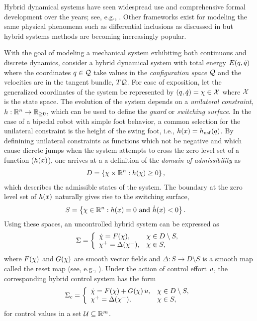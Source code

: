 Hybrid dynamical systems have seen widespread use and comprehensive formal development over the years; see, e.g., \cite{BrBoMi98,GoSaTe09,aut_2014_gcsa_01,ScSc00,WGCCM07}.
%
Other frameworks exist for modeling the same physical phenomena such as differential inclusions as discussed in \cite{Filippov88} but hybrid systems methods are becoming increasingly popular.

With the goal of modeling a mechanical system exhibiting both continuous and discrete dynamics, consider a hybrid dynamical system with total energy $E(q, \dot{q})$ where the coordinates $q \in \mathcal{Q}$ take values in the {\em configuration space} $\mathcal{Q}$ and the velocities are in the tangent bundle, $T\mathcal{Q}$.
%
For ease of exposition, let the generalized coordinates of the system be represented by $(q, \dot{q}) = \chi \in \mathcal{X}$ where $\mathcal{X}$ is the state space.
%
The evolution of the system depends on a {\em unilateral constraint}, $h : \mathbb{R}^{n} \to \mathbb{R}_{\geq 0}$, which can be used to define the {\em guard} or {\em switching surface}.
%
In the case of a bipedal robot with simple foot behavior, a common selection for the unilateral constraint is the height of the swing foot, i.e., $h(x) = h_{\mathrm{nsf}}(q)$.
%
By definining unilateral constraints as functions which not be negative and which cause dicrete jumps when the system attempts to cross the zero level set of a function ($h(x)$), one arrives at a a definition of the {\em domain of admissibility} as
%
\begin{align}
  \label{eq:domain}
  D &= \left\{ \chi \times \mathbb{R}^{n} : h(\chi) \geq 0 \right\},
\end{align}
%
which describes the admissible states of the system.
%
The boundary at the zero level set of $h(x)$ naturally gives rise to the switching surface,
%
\begin{align}
  \label{eq:guard}
  S &= \left\{ \chi \in \mathbb{R}^{n} : h(x) = 0 \mbox{ and } {\dot h}(x) < 0 \right\}.
\end{align}
%
Using these spaces, an uncontrolled hybrid system can be expressed as
%
\begin{align}
  \Sigma = \left\{
  \begin{array}{l l}
    {\dot {\chi}} = F(\chi), & \chi \in D \setminus S,\\
    \chi^{+} = \Delta(\chi^{-}), & \chi \in S,
  \end{array}\right.
  \label{eq:hsys}
\end{align}
%
where $F(\chi)$ and $G(\chi)$ are smooth vector fields and $\Delta : S \to D \setminus S$ is a smooth map called the reset map (see, e.g., \cite{MoGr05}).
%
Under the action of control effort $u$, the corresponding hybrid control system has the form
%
\begin{align}
  \Sigma_{c} = \left\{
  \begin{array}{l l}
    {\dot {\chi}} = F(\chi) + G(\chi) \, u, & \chi \in D \setminus S,\\
    \chi^{+} = \Delta(\chi^{-}), & \chi \in S,
  \end{array}\right.
  \label{eq:hcsys}
\end{align}
%
for control values in a set $\mathcal{U} \subseteq \mathbb{R}^{m}$.
%


